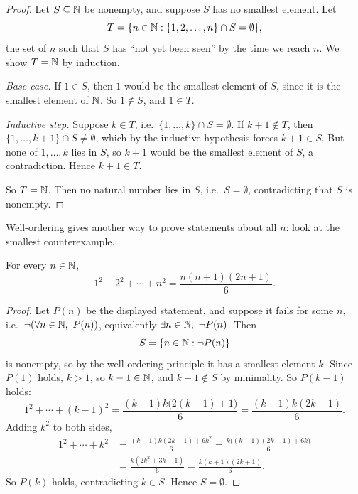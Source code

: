 \begin{proof}
  Let $S \subseteq \mathbb{N}$ be nonempty, and suppose $S$ has no smallest element.
  Let
  \[
    T = \{n \in \mathbb{N} : \{1, 2, \ldots, n\} \cap S = \emptyset\},
  \]
  the set of $n$ such that $S$ has ``not yet been seen'' by the time we reach
  $n$. We show $T = \mathbb{N}$ by induction.

  \emph{Base case.} If $1 \in S$, then $1$ would be the smallest element of
  $S$, since it is the smallest element of $\mathbb{N}$. So $1 \notin S$, and $1 \in T$.

  \emph{Inductive step.} Suppose $k \in T$, i.e.\
  $\{1, \ldots, k\} \cap S = \emptyset$. If $k + 1 \notin T$, then
  $\{1, \ldots, k + 1\} \cap S \neq \emptyset$, which by the inductive
  hypothesis forces $k + 1 \in S$. But none of $1, \ldots, k$ lies in $S$, so
  $k + 1$ would be the smallest element of $S$, a contradiction. Hence
  $k + 1 \in T$.

  So $T = \mathbb{N}$. Then no natural number lies in $S$, i.e.\ $S = \emptyset$,
  contradicting that $S$ is nonempty.
\end{proof}

Well-ordering gives another way to prove statements about all $n$: look at
the smallest counterexample.

\begin{prop}
  For every $n \in \mathbb{N}$,
  \[
    1^2 + 2^2 + \cdots + n^2 = \frac{n(n + 1)(2n + 1)}{6}.
  \]
\end{prop}

\begin{proof}
  Let $P(n)$ be the displayed statement, and suppose it fails for some $n$,
  i.e.\ $\neg(\forall n \in \mathbb{N},\ P(n))$, equivalently
  $\exists n \in \mathbb{N},\ \neg P(n)$. Then
  \[
    S = \{n \in \mathbb{N} : \neg P(n)\}
  \]
  is nonempty, so by the well-ordering principle it has a smallest element
  $k$. Since $P(1)$ holds, $k > 1$, so $k - 1 \in \mathbb{N}$, and $k - 1 \notin S$
  by minimality. So $P(k - 1)$ holds:
  \[
    1^2 + \cdots + (k - 1)^2 = \frac{(k - 1)k\bigl(2(k - 1) + 1\bigr)}{6} = \frac{(k - 1)k(2k - 1)}{6}.
  \]
  Adding $k^2$ to both sides,
  \begin{align*}
    1^2 + \cdots + k^2 &= \frac{(k - 1)k(2k - 1) + 6k^2}{6} = \frac{k\bigl((k - 1)(2k - 1) + 6k\bigr)}{6}\\
    &= \frac{k(2k^2 + 3k + 1)}{6} = \frac{k(k + 1)(2k + 1)}{6}.
  \end{align*}
  So $P(k)$ holds, contradicting $k \in S$. Hence $S = \emptyset$.
\end{proof}

